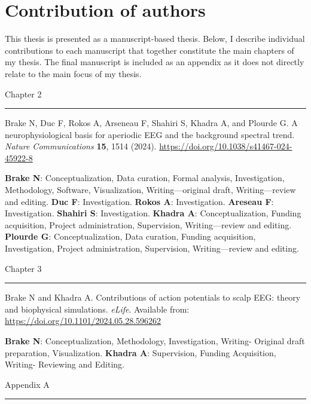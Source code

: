 \chapter*{Contribution of authors}

\setlength{\parindent}{0pt}
\setlength{\parskip}{3pt}

This thesis is presented as a manuscript-based thesis. Below, I describe individual contributions to each manuscript that together constitute the main chapters of my thesis. The final manuscript is included as an appendix as it does not directly relate to the main focus of my thesis.

\vspace{.5em} 
Chapter 2 \hrule

\noindent
\hangindent=1cm
Brake N, Duc F, Rokos A, Arseneau F, Shahiri S, Khadra A, and Plourde G. A neurophysiological basis for aperiodic EEG and the background spectral trend. \textit{Nature Communications} \textbf{15}, 1514 (2024). \url{https://doi.org/10.1038/s41467-024-45922-8}

{\small \noindent \textbf{Brake N}: Conceptualization, Data curation, Formal analysis, Investigation, Methodology, Software, Visualization, Writing—original draft, Writing—review and editing. \textbf{Duc F}: Investigation. \textbf{Rokos A}: Investigation. \textbf{Areseau F}: Investigation. \textbf{Shahiri S}: Investigation. \textbf{Khadra A}: Conceptualization, Funding acquisition, Project administration, Supervision, Writing—review and editing. \textbf{Plourde G}: Conceptualization, Data curation, Funding acquisition, Investigation, Project administration, Supervision, Writing—review and editing.}

\vspace{.5em} Chapter 3 \hrule

\noindent
\hangindent=1cm
Brake N and Khadra A. Contributions of action potentials to scalp EEG: theory and biophysical simulations. \textit{eLife}. Available from: \url{https://doi.org/10.1101/2024.05.28.596262}

{\small \textbf{Brake N}: Conceptualization, Methodology, Investigation, Writing- Original draft preparation, Visualization. \textbf{Khadra A}: Supervision, Funding Acquisition, Writing- Reviewing and Editing.}

\vspace{.5em} 

Appendix A \hrule

